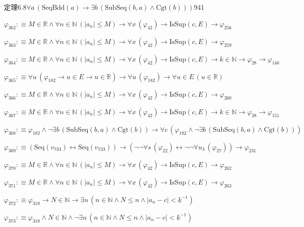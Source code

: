 \begin{fullproof}{定理6.8}{$\forall a\,(\mathrm{SeqBdd}(a) \to \exists b\,(\mathrm{SubSeq}(b,a) \land \mathrm{Cgt}(b)))$}{941}
\begin{abbrevlist}
\item $\varphi_{362} :\equiv M \in \mathbb{R} \land \forall n \in \mathbb{N}\,(\lvert a_{n} \rvert \leq M) \to \forall x\,(\varphi_{42}) \to \mathrm{IsSup}(c,E) \to \varphi_{256}$
\item $\varphi_{363} :\equiv M \in \mathbb{R} \land \forall n \in \mathbb{N}\,(\lvert a_{n} \rvert \leq M) \to \forall x\,(\varphi_{42}) \to \mathrm{IsSup}(c,E) \to \varphi_{259}$
\item $\varphi_{364} :\equiv M \in \mathbb{R} \land \forall n \in \mathbb{N}\,(\lvert a_{n} \rvert \leq M) \to \forall x\,(\varphi_{42}) \to \mathrm{IsSup}(c,E) \to k \in \mathbb{N} \to \varphi_{28} \to \varphi_{146}$
\item $\varphi_{365} :\equiv \forall u\,(\varphi_{182} \to u \in E \to u \in \mathbb{R}) \to \forall u\,(\varphi_{182}) \to \forall u \in E\,(u \in \mathbb{R})$
\item $\varphi_{366} :\equiv M \in \mathbb{R} \land \forall n \in \mathbb{N}\,(\lvert a_{n} \rvert \leq M) \to \forall x\,(\varphi_{42}) \to \mathrm{IsSup}(c,E) \to \varphi_{260}$
\item $\varphi_{367} :\equiv M \in \mathbb{R} \land \forall n \in \mathbb{N}\,(\lvert a_{n} \rvert \leq M) \to \forall x\,(\varphi_{42}) \to \mathrm{IsSup}(c,E) \to k \in \mathbb{N} \to \varphi_{28} \to \varphi_{151}$
\item $\varphi_{368} :\equiv \varphi_{182} \land \neg \exists b\,(\mathrm{SubSeq}(b,a) \land \mathrm{Cgt}(b)) \to \forall c\,(\varphi_{182} \land \neg \exists b\,(\mathrm{SubSeq}(b,a) \land \mathrm{Cgt}(b)))$
\item $\varphi_{369} :\equiv (\mathrm{Seq}(v_{733}) \leftrightarrow \mathrm{Seq}(v_{733})) \to (\neg \neg \forall s\,(\varphi_{22}) \leftrightarrow \neg \neg \forall u_{3}\,(\varphi_{27})) \to \varphi_{231}$
\item $\varphi_{370} :\equiv M \in \mathbb{R} \land \forall n \in \mathbb{N}\,(\lvert a_{n} \rvert \leq M) \to \forall x\,(\varphi_{42}) \to \mathrm{IsSup}(c,E) \to \varphi_{262}$
\item $\varphi_{371} :\equiv M \in \mathbb{R} \land \forall n \in \mathbb{N}\,(\lvert a_{n} \rvert \leq M) \to \forall x\,(\varphi_{42}) \to \mathrm{IsSup}(c,E) \to \varphi_{263}$
\item $\varphi_{372} :\equiv \varphi_{318} \to N \in \mathbb{N} \to \exists n\,(n \in \mathbb{N} \land N \leq n \land \lvert a_{n} - c \rvert < \underline{k}^{-1})$
\item $\varphi_{373} :\equiv \varphi_{318} \land N \in \mathbb{N} \land \neg \exists n\,(n \in \mathbb{N} \land N \leq n \land \lvert a_{n} - c \rvert < \underline{k}^{-1})$

\end{abbrevlist}
\end{fullproof}
